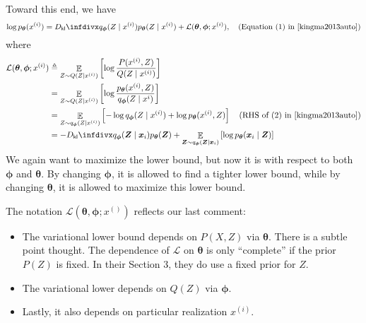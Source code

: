\documentclass[11pt,a4paper]{article}
\begin{document}
Toward this end, we have 
\[
\log p_{\boldsymbol \theta}(x^{(i)})
= \Dkl{q_{\boldsymbol \phi}(Z \mid x^{(i)})}{p_{\boldsymbol \theta}(Z \mid x^{(i)})} + \mathcal{L}(\boldsymbol \theta, \boldsymbol \phi; x^{(i)}), \quad \text{(Equation (1) in \cite{kingma2013auto})}
\] 
where 
\begin{align*}
\mathcal{L}(\boldsymbol \theta, \boldsymbol \phi; x^{(i)})
&\triangleq \mathop{\mathbb{E}}_{Z \sim Q(Z \mid x^{(i)})} \left[ \log \dfrac{P(x^{(i)}, Z)}{Q(Z \mid x^{(i)})} \right] \\
&= \mathop{\mathbb{E}}_{Z \sim Q(Z \mid x^{(i)})} \left[ \log \dfrac{p_{\boldsymbol \theta}(x^{(i)}, Z)}{q_{\boldsymbol \phi}(Z \mid x^{i})} \right] \\
&= \mathop{\mathbb{E}}_{Z \sim q_{\boldsymbol \phi}(Z \mid x^{(i)})} \left[ - \log q_{\boldsymbol \phi}(Z \mid x^{(i)}) + \log p_{\boldsymbol \theta}(x^{(i)}, Z) \right] 
\quad \text{(RHS of (2) in \cite{kingma2013auto})} \\
&= - \Dkl{q_{\boldsymbol \phi}(\bm{Z} \mid \bm{x}_{i})}{p_{\boldsymbol \theta}(\bm{Z})} + \mathop{\mathbb{E}}_{\bm{Z} \sim q_{\boldsymbol \phi}(\bm{Z} \mid \bm{x}_{i})} \left[ \log p_{\boldsymbol \theta}(\bm{x}_i \mid \bm{Z}) \right]
\end{align*} 
We again want to maximize the lower bound, but now it is with respect to both $\boldsymbol \phi$ and $\boldsymbol \theta$. By changing $\boldsymbol \phi$, it is allowed to find a tighter lower bound, while by changing $\boldsymbol \theta$, it is allowed to maximize this lower bound.

The notation $\mathcal{L}(\boldsymbol \theta, \boldsymbol \phi; x^{()})$  reflects our last comment:
\begin{itemize}
    \item The variational lower bound depends on $P(X, Z)$ via $\boldsymbol \theta$. There is a subtle point thought. The dependence of $\mathcal{L}$ on $\boldsymbol \theta$ is only ``complete'' if the prior $P(Z)$ is fixed. In their Section 3, they do use a fixed prior for $Z$.
    \item The variational lower depends on $Q(Z)$ via $\boldsymbol \phi$.
    \item Lastly, it also depends on particular realization $x^{(i)}$.
\end{itemize}
\end{document}
